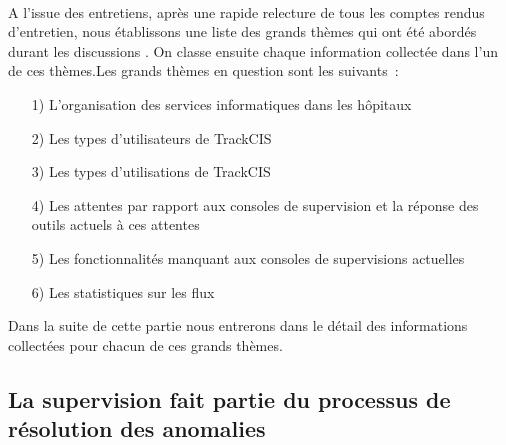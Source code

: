 			\paragraph{}%
			A l'issue des entretiens, après une rapide relecture de tous les comptes
			rendus d'entretien, nous établissons une liste des grands thèmes qui ont été
			abordés durant les discussions \citep{alami_les_2009}.
			On classe ensuite chaque information collectée dans l'un de ces
			thèmes.\newline Les grands thèmes en question sont les suivants~:
			\begin{itemize}
			  \item[1)] L’organisation des services informatiques dans les
			  hôpitaux
			  \item[2)] Les types d’utilisateurs de TrackCIS
			  \item[3)] Les types d’utilisations de TrackCIS
			  \item[4)] Les attentes par rapport aux consoles de supervision
			  et la réponse des outils actuels à ces attentes
			  \item[5)] Les fonctionnalités manquant aux consoles de
			  supervisions actuelles
			  \item[6)] Les statistiques sur les flux
			\end{itemize}
			Dans la suite de cette partie nous entrerons dans le détail des informations
			collectées pour chacun de ces grands thèmes.
			
		\subsection{La supervision fait partie du processus de résolution des
		anomalies}
